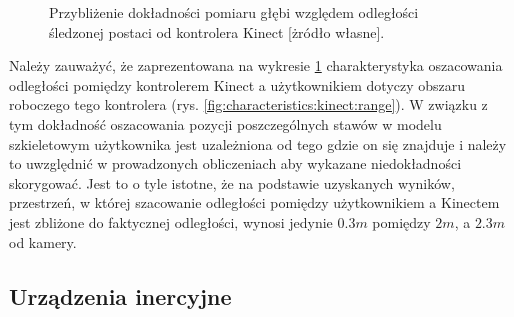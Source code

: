 \pgfplotsset{width=12cm,compat=1.8}
		
\begin{figure}
	\centering
							
	\caption{Przybliżenie dokładności pomiaru głębi względem odległości śledzonej postaci od kontrolera Kinect [żródło własne].}
	\label{fig:characteristics:kinect:distanceAccuracy}
\end{figure}
		
Należy zauważyć, że zaprezentowana na wykresie \ref{fig:characteristics:kinect:distanceAccuracy} charakterystyka oszacowania odległości pomiędzy kontrolerem Kinect a użytkownikiem dotyczy obszaru roboczego tego kontrolera (rys. \ref{fig:characteristics:kinect:range}). W związku z tym dokładność oszacowania pozycji poszczególnych stawów w modelu szkieletowym użytkownika jest uzależniona od tego gdzie on się znajduje i należy to uwzględnić w prowadzonych obliczeniach aby wykazane niedokładności skorygować.
Jest to o tyle istotne, że na podstawie uzyskanych wyników, przestrzeń, w której szacowanie odległości pomiędzy użytkownikiem a Kinectem jest zbliżone do faktycznej odległości, wynosi jedynie $0.3m$ pomiędzy $2m$, a $2.3m$ od kamery.  


		
\subsection{Urządzenia inercyjne}\label{sec:characteristics:imu}
		
